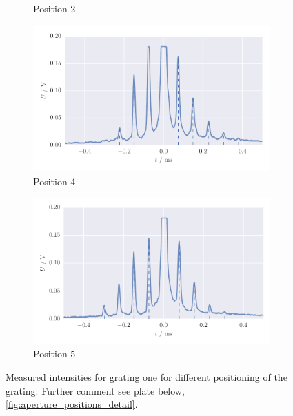 \begin{figure}[H]
\begin{subfigure}[b]{\mpltw}
        \caption{Position 2}
        \label{}
    \end{subfigure}
    \begin{subfigure}[b]{\mpltw}
        \includegraphics[width=\textwidth]{figures/aperture_4b}
        \caption{Position 4}
        \label{}
    \end{subfigure}
    \begin{subfigure}[b]{\mpltw}
        \includegraphics[width=\textwidth]{figures/aperture_5b}
        \caption{Position 5}
        \label{}
    \end{subfigure}
    \caption{
        Measured intensities for grating one for different positioning of the grating.
        Further comment see plate below, \ref{fig:aperture_positions_detail}.
        }
\end{figure}
